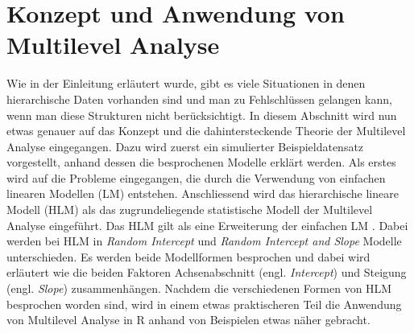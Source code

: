 \documentclass[12pt]{article}\usepackage[]{graphicx}\usepackage[]{color}
\begin{document}
\section{Konzept und Anwendung von Multilevel Analyse}
Wie in der Einleitung erläutert wurde, gibt es viele Situationen in denen hierarchische Daten vorhanden sind und man zu Fehlschlüssen gelangen kann, wenn man diese Strukturen nicht berücksichtigt. In diesem Abschnitt wird nun etwas genauer auf das Konzept und die dahintersteckende Theorie der Multilevel Analyse eingegangen. Dazu wird zuerst ein simulierter Beispieldatensatz vorgestellt, anhand dessen die besprochenen Modelle erklärt werden. Als erstes wird auf die Probleme eingegangen, die durch die Verwendung von einfachen linearen Modellen (LM) entstehen. Anschliessend wird das hierarchische lineare Modell (HLM) als das zugrundeliegende statistische Modell der Multilevel Analyse eingeführt. Das HLM gilt als eine Erweiterung der einfachen LM \citep{SnijdersTomA.B2012Ma:a}. Dabei werden bei HLM in \textit{Random Intercept} und \textit{Random Intercept and Slope} Modelle unterschieden. Es werden beide Modellformen besprochen und dabei wird erläutert wie die beiden Faktoren Achsenabschnitt (engl. \textit{Intercept}) und Steigung (engl. \textit{Slope}) zusammenhängen. Nachdem die verschiedenen Formen von HLM besprochen worden sind, wird in einem etwas praktischeren Teil die Anwendung von Multilevel Analyse in R anhand von Beispielen etwas näher gebracht.
\end{document}
